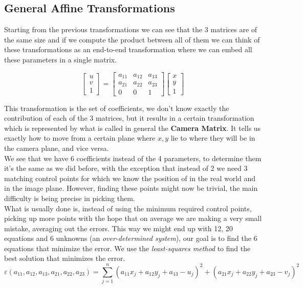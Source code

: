 \subsection{General Affine Transformations}

Starting from the previous transformations we can see that the 3 matrices are of the same size and if we compute the product between all of them we can think of these transformations as an end-to-end transformation where we can embed all these parameters in a single matrix.

\[
    \begin{bmatrix}
    u \\
    v \\
    1
    \end{bmatrix}
    =
    \begin{bmatrix}
    a_{11} & a_{12} & a_{13} \\
    a_{21} & a_{22} & a_{23} \\
    0 & 0 & 1
    \end{bmatrix}
    \begin{bmatrix}
        x \\
        y \\
        1
    \end{bmatrix}
\]

This transformation is the set of coefficients, we don't know exactly the contribution of each of the 3 matrices, but it results in a certain transformation which is represented by what is called in general the \textbf{Camera Matrix}. It tells us exactly how to move from a certain plane where \(x, y\) lie to where they will be in the camera plane, and vice versa.
\\
We see that we have 6 coefficients instead of the 4 parameters, to determine them it's the same as we did before, with the exception that instead of 2 we need 3 matching control points for which we know the position of in the real world and in the image plane. However, finding these points might now be trivial,
the main difficulty is being precise in picking them.
\\
What is usually done is, instead of using the minimum required control points, picking up more points with the hope that on average we are making a very small mistake, averaging out the errors. This way we might end up with 12, 20 equations and 6 unknowns (an \textit{over-determined system}), our goal is to find the 6 equations that minimize the error. We use the \textit{least-squares method} to find the best solution that minimizes the error.
\[
    \varepsilon (a_{11}, a_{12}, a_{13}, a_{21}, a_{22}, a_{23}) = 
\sum_{j=1}^{n} (a_{11}x_j + a_{12}y_j + a_{13} - u_j)^2 
+ (a_{21}x_j + a_{22}y_j + a_{23} - v_j)^2
\]

